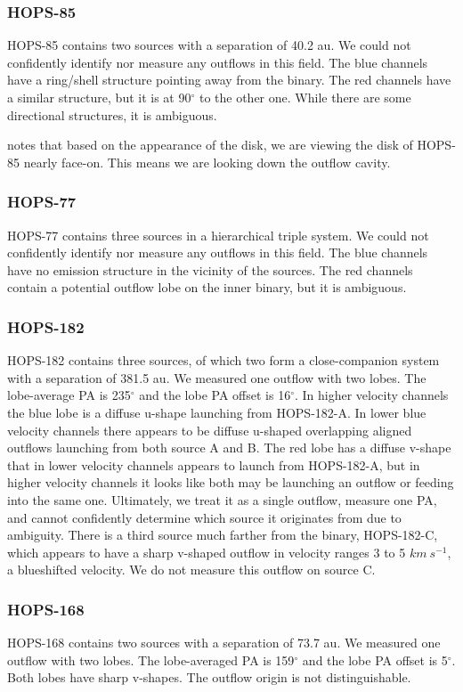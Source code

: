 \documentclass[linenumbers,twocolumn, twocolappendix]{aastex631}
\begin{document}
\subsubsection{HOPS-85}
HOPS-85 contains two sources with a separation of 40.2 au. We could not confidently identify nor measure any outflows in this field. The blue channels have a ring/shell structure pointing away from the binary. The red channels have a similar structure, but it is at 90$^\circ$ to the other one. While there are some directional structures, it is ambiguous.

\cite{Federman_2023} notes that based on the appearance of the disk, we are viewing the disk of HOPS-85 nearly face-on. This means we are looking down the outflow cavity.

\subsubsection{HOPS-77}
HOPS-77 contains three sources in a hierarchical triple system. We could not confidently identify nor measure any outflows in this field. The blue channels have no emission structure in the vicinity of the sources. The red channels contain a potential outflow lobe on the inner binary, but it is ambiguous.


\subsubsection{HOPS-182}
HOPS-182 contains three sources, of which two form a close-companion system with a separation of 381.5 au. We measured one outflow with two lobes. The lobe-average PA is 235$^\circ$ and the lobe PA offset is 16$^\circ$. In higher velocity channels the blue lobe is a diffuse u-shape launching from HOPS-182-A. In lower blue velocity channels there appears to be diffuse u-shaped overlapping aligned outflows launching from both source A and B. The red lobe has a diffuse v-shape that in lower velocity channels appears to launch from HOPS-182-A, but in higher velocity channels it looks like both may be launching an outflow or feeding into the same one. Ultimately, we treat it as a single outflow, measure one PA, and cannot confidently determine which source it originates from due to ambiguity. There is a third source much farther from the binary, HOPS-182-C, which appears to have a sharp v-shaped outflow in velocity ranges 3 to 5 $km~s^{-1}$, a blueshifted velocity. We do not measure this outflow on source C.

\subsubsection{HOPS-168}
HOPS-168 contains two sources with a separation of 73.7 au. We measured one outflow with two lobes. The lobe-averaged PA is 159$^\circ$ and the lobe PA offset is 5$^\circ$. Both lobes have sharp v-shapes. The outflow origin is not distinguishable.
\end{document}
